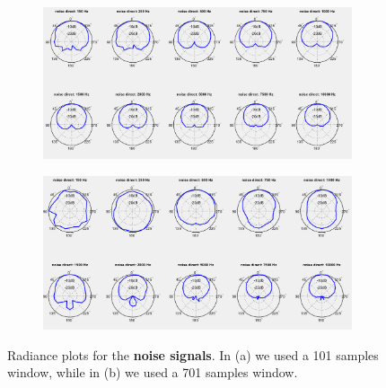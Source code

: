 \documentclass[a4paper]{article}
\begin{document}
\begin{figure}[h]
	\centering
	\begin{subfigure}{0.85\linewidth}
		\centering
		\includegraphics[width=\linewidth]{5a_radiance_50.png}
		\caption{}
	\end{subfigure}
	
	\begin{subfigure}{0.85\linewidth}
		\centering
		\includegraphics[width=\linewidth]{5a_radiance_350.png}
		\caption{}
	\end{subfigure}
	\caption{Radiance plots for the \textbf{noise signals}. In (a) we used a 101 samples window, while in (b) we used a 701 samples window.}
	\label{fig:noiserad5}
\end{figure}
\end{document}
